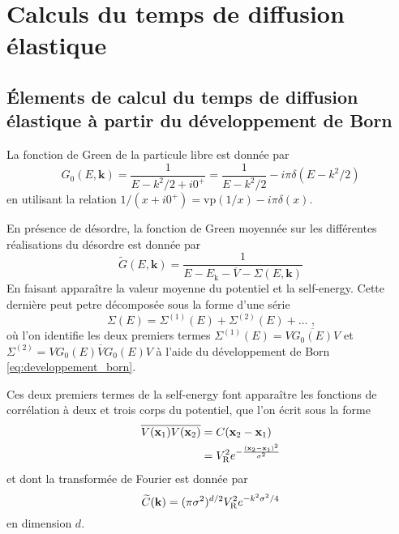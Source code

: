 \chapter{Calculs du temps de diffusion élastique}
\label{ch:anex_taus}

\section{Élements de calcul du temps de diffusion élastique à partir du développement de Born}
La fonction de Green de la particule libre est donnée par
\begin{equation}
G_0(E,\mathbf{k})=\frac{1}{E-k^2/2+i0^+}=\frac{1}{E-k^2/2}-i \pi \delta(E-k^2/2)
\end{equation}
en utilisant la relation $ 1/(x+i0^+)=\mathrm{vp}(1/x)-i\pi \delta(x)$.

En présence de désordre, la fonction de Green moyennée sur les différentes réalisations du désordre est donnée par 
\begin{equation}
\widetilde{G}(E,\mathbf{k})=\frac{1}{E-E_{\mathrm{k}}-\overline{V}-\Sigma(E,\mathbf{k})}
\end{equation}
En faisant apparaître la valeur moyenne du potentiel et la self-energy. Cette dernière peut petre décomposée sous la forme d'une série 
\begin{equation}
\Sigma(E)=\Sigma^{(1)}(E) + \Sigma^{(2)}(E) + \dots \text{ ,}
\end{equation}
où l'on identifie les deux premiers termes $\Sigma^{(1)}(E)=\overline{V G_0(E) V}$ et $\Sigma^{(2)}=\overline{V G_0(E) V G_0(E) V}$ à l'aide du développement de Born \ref{eq:developpement_born}.

Ces deux premiers termes de la self-energy font apparaître les fonctions de corrélation à deux et trois corps du potentiel, que l'on écrit sous la forme
\begin{align}
\overline{V(\mathbf{x}_{\mathrm{1}})V(\mathbf{x}_{\mathrm{2}})}&=C(\mathbf{x}_{\mathrm{2}}-\mathbf{x}_{\mathrm{1}}) \\
&=V_{\mathrm{R}}^2 e^{-\frac{(\mathbf{x}_{\mathrm{2}}-\mathbf{x}_{\mathrm{1}})^2}{\sigma^2}}
\end{align}
et dont la transformée de Fourier est donnée par
\begin{equation}
\widetilde{C}(\mathbf{k})=(\pi\sigma^2)^{d/2}V_{\mathrm{R}}^2 e^{-k^2\sigma^2/4}
\end{equation}
en dimension $d$.

